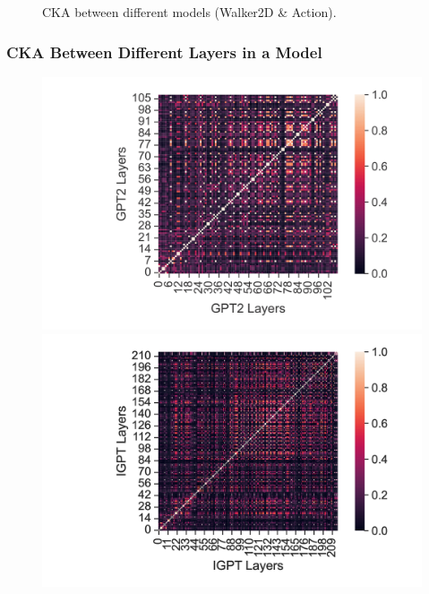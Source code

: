 \documentclass{article}
\begin{document}
\begin{figure}[H]
\begin{minipage}[b]{0.32\linewidth}
    \end{minipage}
    \caption{CKA between different models (Walker2D \& Action).}
\end{figure}

\subsubsection{CKA Between Different Layers in a Model}

\begin{figure}[H]
    \centering
    \begin{minipage}[b]{0.32\linewidth}
        \includegraphics[width=\linewidth]{figs/cka_40_40_gpt2gpt2_hopper_medium_666_reward.png}
    \end{minipage}
    \begin{minipage}[b]{0.32\linewidth}
        \includegraphics[width=\linewidth]{figs/cka_40_40_igptigpt_hopper_medium_666_reward.png}

\end{minipage}
\end{figure}
\end{document}
